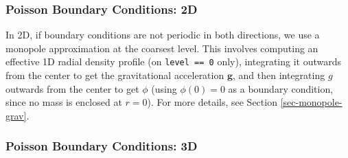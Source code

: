 \subsubsection{Poisson Boundary Conditions: 2D}

In 2D, if boundary conditions are not periodic in both directions, we use a 
monopole approximation at the coarsest level. This involves computing an effective
1D radial density profile (on \texttt{level == 0} only), integrating it outwards
from the center to get the gravitational acceleration $\mathbf{g}$, and then integrating
$g$ outwards from the center to get $\phi$ (using $\phi(0) = 0$ as a boundary condition,
since no mass is enclosed at $r = 0$). For more details, see Section \ref{sec-monopole-grav}.

\subsubsection{Poisson Boundary Conditions: 3D}\label{sec-poisson-3d-bcs}


